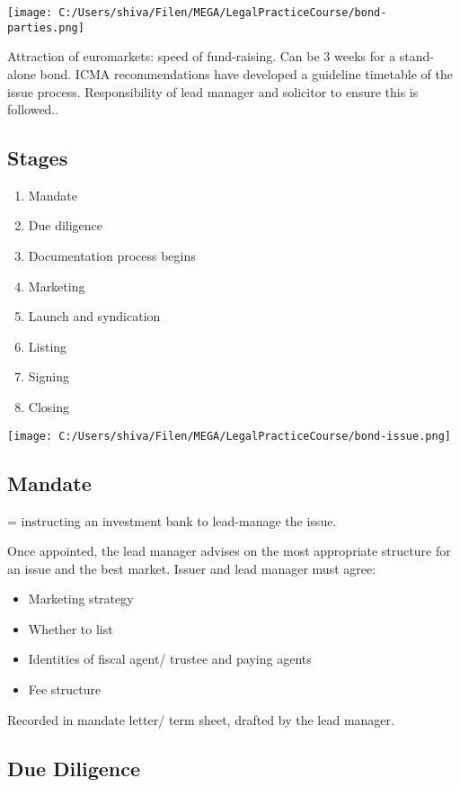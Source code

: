\documentclass[
]{article}
\providecommand{\tightlist}{%
  \setlength{\itemsep}{0pt}\setlength{\parskip}{0pt}}
\begin{document}
\texttt{[image: C:/Users/shiva/Filen/MEGA/LegalPracticeCourse/bond-parties.png]}

Attraction of euromarkets: speed of fund-raising. Can be 3 weeks for a
stand-alone bond. ICMA recommendations have developed a guideline
timetable of the issue process. Responsibility of lead manager and
solicitor to ensure this is followed..

\hypertarget{stages}{%
\subsection{Stages}\label{stages}}

\begin{enumerate}
\tightlist
\item
  Mandate
\item
  Due diligence
\item
  Documentation process begins
\item
  Marketing
\item
  Launch and syndication
\item
  Listing
\item
  Signing
\item
  Closing
\end{enumerate}

\texttt{[image: C:/Users/shiva/Filen/MEGA/LegalPracticeCourse/bond-issue.png]}

\hypertarget{mandate}{%
\subsection{Mandate}\label{mandate}}

= instructing an investment bank to lead-manage the issue.

Once appointed, the lead manager advises on the most appropriate
structure for an issue and the best market. Issuer and lead manager must
agree:

\begin{itemize}
\tightlist
\item
  Marketing strategy
\item
  Whether to list
\item
  Identities of fiscal agent/ trustee and paying agents
\item
  Fee structure
\end{itemize}

Recorded in mandate letter/ term sheet, drafted by the lead manager.

\hypertarget{due-diligence}{%
\subsection{Due Diligence}\label{due-diligence}}
\end{document}
